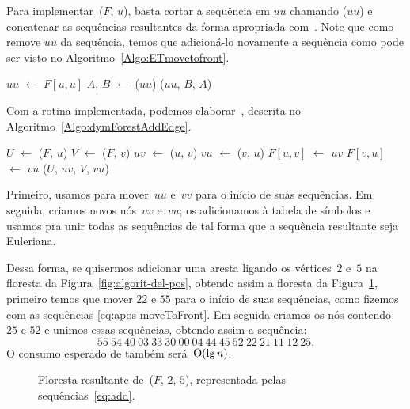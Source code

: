 Para implementar~\ETmovetofront($F$, $u$), basta cortar a sequência em $uu$ chamando \treapSplit($uu$) e concatenar as sequências resultantes da forma apropriada com~\treapJoin{}. Note que como \treapSplit{} remove $uu$ da sequência, temos que adicioná-lo novamente a sequência como pode ser visto no Algoritmo~\ref{Algo:ETmovetofront}.

\begin{algorithm}[htb]
\caption{\ETmovetofront($F$, $u$)}
\label{Algo:ETmovetofront}
\begin{algorithmic}[1]
\State $uu$ $\gets$ $F[u,u]$
\State $A$, $B$ $\gets$ \treapSplit($uu$)
\State \Return \treapJoin($uu$, $B$, $A$)
\end{algorithmic}
\end{algorithm}


Com a rotina \ETmovetofront{} implementada, podemos elaborar~\dymForestAddEdge{}, descrita no Algoritmo~\ref{Algo:dymForestAddEdge}.


\begin{algorithm}[htb]
\caption{\dymForestAddEdge($F$, $u$, $v$)}
\label{Algo:dymForestAddEdge}
\begin{algorithmic}[1]
\State $U$ $\gets$ \ETmovetofront($F$, $u$)
\State $V$ $\gets$ \ETmovetofront($F$, $v$)
\State $uv$ $\gets$ \treapCreate($u$, $v$)
\State $vu$ $\gets$ \treapCreate($v$, $u$)
\State $F[u,v]$ $\gets$ $uv$
\State $F[v,u]$ $\gets$ $vu$
\State \treapJoin($U$, $uv$, $V$, $vu$)
\end{algorithmic}
\end{algorithm}

Primeiro, usamos \ETmovetofront{} para mover~$uu$ e~$vv$ para o início de suas sequências.
Em seguida, criamos novos nós~$uv$ e~$vu$; os adicionamos à tabela de símbolos e usamos \treapJoin{} pra unir todas as sequências de tal forma que a sequência resultante seja Euleriana.

\newpage
Dessa forma, se quisermos adicionar uma aresta ligando os vértices~$2$ e~$5$ na floresta da Figura~\ref{fig:algorit-del-pos}, obtendo assim a floresta da Figura~\ref{fig:algorit-add-pos}, primeiro temos que mover $22$ e $55$ para o início de suas sequências, como fizemos com as sequências \eqref{eq:apos-moveToFront}. Em seguida criamos os nós contendo $25$ e $52$ e unimos essas sequências, obtendo assim a sequência:
\begin{equation}
55~54~40~03~33~30~00~04~44~45~52~22~21~11~12~25.\label{eq:add}
\end{equation}
O consumo esperado de \dymForestAddEdge{} também será~$\mathrm{O}(\lg n)$.

\begin{figure}[htb]
\centering

\caption{Floresta resultante de~\dymForestAddEdge($F$, $2$, $5$), representada pelas sequências~\eqref{eq:add}.}
\label{fig:algorit-add-pos}
\end{figure}
